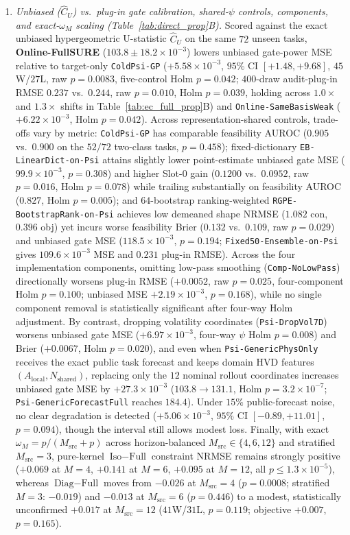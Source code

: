 \begin{enumerate}
  \item \emph{Unbiased ($\widehat{C}_U$) vs.\ plug-in gate calibration, shared-$\psi$ controls, components, and exact-$\omega_M$ scaling (Table~\ref{tab:direct_prop}B).} Scored against the exact unbiased hypergeometric U-statistic $\widehat{C}_U$ on the same $72$ unseen tasks, \textbf{Online-FullSURE} ($103.8\pm 18.2 \times 10^{-3}$) lowers unbiased gate-power MSE relative to target-only \texttt{ColdPsi-GP} ($+5.58\times 10^{-3}$, $95\%$ CI $[+1.48, +9.68]$, $45$W/$27$L, raw $p=0.0083$, five-control Holm $p=0.042$; $400$-draw audit-plug-in RMSE $0.237$ vs.\ $0.244$, raw $p=0.010$, Holm $p=0.039$, holding across $1.0\times$ and $1.3\times$ shifts in Table~\ref*{tab:ec_full_prop}B) and \texttt{Online-SameBasisWeak} ($+6.22\times 10^{-3}$, Holm $p=0.042$). Across representation-shared controls, trade-offs vary by metric: \texttt{ColdPsi-GP} has comparable feasibility AUROC ($0.905$ vs.\ $0.900$ on the $52/72$ two-class tasks, $p=0.458$); fixed-dictionary \texttt{EB-LinearDict-on-Psi} attains slightly lower point-estimate unbiased gate MSE ($99.9\times 10^{-3}$, $p=0.308$) and higher Slot-0 gain ($0.1200$ vs.\ $0.0952$, raw $p=0.016$, Holm $p=0.078$) while trailing substantially on feasibility AUROC ($0.827$, Holm $p=0.005$); and $64$-bootstrap ranking-weighted \texttt{RGPE-BootstrapRank-on-Psi} achieves low demeaned shape NRMSE ($1.082$ con, $0.396$ obj) yet incurs worse feasibility Brier ($0.132$ vs.\ $0.109$, raw $p=0.029$) and unbiased gate MSE ($118.5\times 10^{-3}$, $p=0.194$; \texttt{Fixed50-Ensemble-on-Psi} gives $109.6\times 10^{-3}$ MSE and $0.231$ plug-in RMSE). Across the four implementation components, omitting low-pass smoothing (\texttt{Comp-NoLowPass}) directionally worsens plug-in RMSE ($+0.0052$, raw $p=0.025$, four-component Holm $p=0.100$; unbiased MSE $+2.19\times 10^{-3}$, $p=0.168$), while no single component removal is statistically significant after four-way Holm adjustment. By contrast, dropping volatility coordinates (\texttt{Psi-DropVol7D}) worsens unbiased gate MSE ($+6.97\times 10^{-3}$, four-way $\psi$ Holm $p=0.008$) and Brier ($+0.0067$, Holm $p=0.020$), and even when \texttt{Psi-GenericPhysOnly} receives the exact public task forecast and keeps domain HVD features $(A_{\mathrm{local}}, N_{\mathrm{shared}})$, replacing only the $12$ nominal rollout coordinates increases unbiased gate MSE by $+27.3\times 10^{-3}$ ($103.8 \to 131.1$, Holm $p = 3.2\times 10^{-7}$; \texttt{Psi-GenericForecastFull} reaches $184.4$). Under $15\%$ public-forecast noise, no clear degradation is detected ($+5.06\times 10^{-3}$, $95\%$ CI $[-0.89, +11.01]$, $p=0.094$), though the interval still allows modest loss. Finally, with exact $\omega_M = p/(M_{\mathrm{src}}+p)$ across horizon-balanced $M_{\mathrm{src}} \in \{4, 6, 12\}$ and stratified $M_{\mathrm{src}}=3$, pure-kernel $\text{Iso}-\text{Full}$ constraint NRMSE remains strongly positive ($+0.069$ at $M=4$, $+0.141$ at $M=6$, $+0.095$ at $M=12$, all $p \le 1.3\times 10^{-5}$), whereas $\text{Diag}-\text{Full}$ moves from $-0.026$ at $M_{\mathrm{src}}=4$ ($p=0.0008$; stratified $M=3$: $-0.019$) and $-0.013$ at $M_{\mathrm{src}}=6$ ($p=0.446$) to a modest, statistically unconfirmed $+0.017$ at $M_{\mathrm{src}}=12$ ($41$W/$31$L, $p=0.119$; objective $+0.007$, $p=0.165$).

\end{enumerate}
